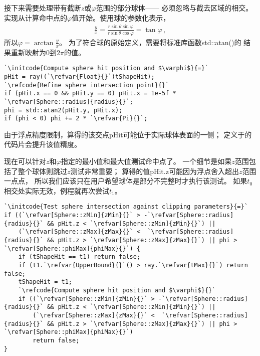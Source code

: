 接下来需要处理带有截断$z$或$\varphi$范围的部分球体——
必须忽略与截去区域的相交。
实现从计算命中点的$\varphi$值开始。使用球的参数化表示，
\begin{align*}
    \frac{y}{x}=\frac{r\sin\theta\sin\varphi}{r\sin\theta\cos\varphi}=\tan\varphi\, ,
\end{align*}
所以$\displaystyle\varphi=\arctan\frac{y}{x}$。
为了符合球的原始定义，需要将标准库函数{\ttfamily std::atan()}的
结果重新映射为$0$到$2\pi$的值。
\begin{lstlisting}
`\initcode{Compute sphere hit position and $\varphi$}{=}`
pHit = ray((`\refvar{Float}{}`)tShapeHit);
`\refcode{Refine sphere intersection point}{}`
if (pHit.x == 0 && pHit.y == 0) pHit.x = 1e-5f * `\refvar[Sphere::radius]{radius}{}`;
phi = std::atan2(pHit.y, pHit.x);
if (phi < 0) phi += 2 * `\refvar{Pi}{}`;
\end{lstlisting}

由于浮点精度限制，算得的该交点{\ttfamily pHit}可能位于实际球体表面的一侧；
定义于的
代码片会提升该值精度。

现在可以针对$z$和$\varphi$指定的最小值和最大值测试命中点了。
一个细节是如果$z$范围包括了整个球体则跳过$z$测试非常重要；
算得的值{\ttfamily pHit.z}可能因为浮点舍入超出$z$范围一点点，
所以我们应该只在用户希望球体是部分不完整时才执行该测试。
如果$t_0$相交处实际无效，例程就再次尝试$t_1$。
\begin{lstlisting}
`\initcode{Test sphere intersection against clipping parameters}{=}`
if ((`\refvar[Sphere::zMin]{zMin}{}` > -`\refvar[Sphere::radius]{radius}{}` && pHit.z < `\refvar[Sphere::zMin]{zMin}{}`) ||
    (`\refvar[Sphere::zMax]{zMax}{}` <  `\refvar[Sphere::radius]{radius}{}` && pHit.z > `\refvar[Sphere::zMax]{zMax}{}`) || phi > `\refvar[Sphere::phiMax]{phiMax}{}`) {
    if (tShapeHit == t1) return false;
    if (t1.`\refvar{UpperBound}{}`() > ray.`\refvar{tMax}{}`) return false;
    tShapeHit = t1;
    `\refcode{Compute sphere hit position and $\varphi$}{}`
    if ((`\refvar[Sphere::zMin]{zMin}{}` > -`\refvar[Sphere::radius]{radius}{}` && pHit.z < `\refvar[Sphere::zMin]{zMin}{}`) ||
        (`\refvar[Sphere::zMax]{zMax}{}` <  `\refvar[Sphere::radius]{radius}{}` && pHit.z > `\refvar[Sphere::zMax]{zMax}{}`) || phi > `\refvar[Sphere::phiMax]{phiMax}{}`)
        return false;
}
\end{lstlisting}

